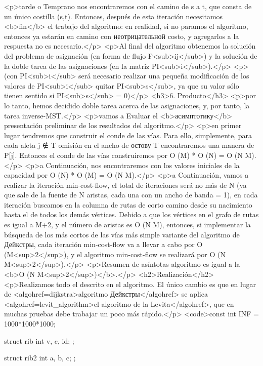 <p>tarde o Temprano nos encontraremos con el camino de s a t, que consta de un único costilla (s,t). Entonces, después de esta iteración necesitamos <b>fin</b> el trabajo del algoritmo: en realidad, si no paramos el algoritmo, entonces ya estarán en camino con неотрицательной costo, y agregarlos a la respuesta no es necesario.</p>
<p>Al final del algoritmo obtenemos la solución del problema de asignación (en forma de flujo F<sub>ij</sub>) y la solución de la doble tarea de las asignaciones (en la matriz PI<sub>i</sub>).</p>
<p>(con PI<sub>i</sub> será necesario realizar una pequeña modificación de los valores de PI<sub>i</sub> quitar PI<sub>s</sub>, ya que su valor sólo tienen sentido si PI<sub>s</sub> = 0)</p>
<h3>6. Producto</h3>
<p>por lo tanto, hemos decidido doble tarea acerca de las asignaciones, y, por tanto, la tarea inverse-MST.</p>
<p>vamos a Evaluar el <b>асимптотику</b> presentación preliminar de los resultados del algoritmo.</p>
<p>en primer lugar tendremos que construir el conde de las vías. Para ello, simplemente, para cada aleta j ∉ T omisión en el ancho de остову T encontraremos una manera de P[j]. Entonces el conde de las vías construiremos por O (M) * O (N) = O (N M).</p>
<p>a Continuación, nos encontraremos con los valores iniciales de la capacidad por O (N) * O (M) = O (N M).</p>
<p>a Continuación, vamos a realizar la iteración min-cost-flow, el total de iteraciones será no más de N (ya que sale de la fuente de N aristas, cada una con un ancho de banda = 1), en cada iteración buscamos en la columna de rutas de corto camino desde su nacimiento hasta el de todos los demás vértices. Debido a que los vértices en el grafo de rutas es igual a M+2, y el número de aristas es O (N M), entonces, si implementar la búsqueda de los más cortos de las vías más simple variante del algoritmo de Дейкстры, cada iteración min-cost-flow va a llevar a cabo por O (M<sup>2</sup>), y el algoritmo min-cost-flow se realizará por O (N M<sup>2</sup>).</p>
<p>Resumen de asíntotas algoritmo es igual a la <b>O (N M<sup>2</sup>)</b>.</p>
<h2>Realización</h2>
<p>Realizamos todo el descrito en el algoritmo. El único cambio es que en lugar de <algohref=dijkstra>algoritmo Дейкстры</algohref> se aplica <algohref=levit_algorithm>el algoritmo de la Levita</algohref>, que en muchas pruebas debe trabajar un poco más rápido.</p>
<code>const int INF = 1000*1000*1000;

struct rib {
int v, c, id;
};

struct rib2 {
int a, b, c;
};

